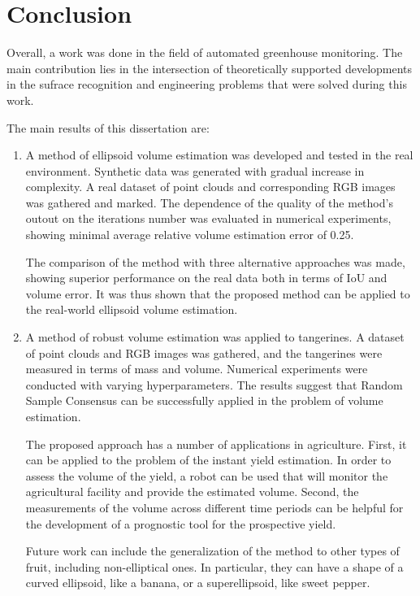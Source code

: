 \chapter{Conclusion}
\label{cap:conclusion}


Overall, a work was done in the field of automated greenhouse monitoring.
The main contribution lies in the intersection of theoretically supported developments in the sufrace recognition and engineering problems that were solved during this work.

The main results of this dissertation are:

\begin{enumerate}
\item A method of ellipsoid volume estimation was developed and tested in the real environment.
Synthetic data was generated with gradual increase in complexity.
A real dataset of point clouds and corresponding RGB images was gathered and marked.
The dependence of the quality of the method's outout on the iterations number was evaluated in numerical experiments, showing minimal average relative volume estimation error of 0.25.

The comparison of the method with three alternative approaches was made, showing superior performance on the real data both in terms of IoU and volume error.
It was thus shown that the proposed method can be applied to the real-world ellipsoid volume estimation.

\item A method of robust volume estimation was applied to tangerines.
A dataset of point clouds and RGB images was gathered, and the tangerines were measured in terms of mass and volume.
Numerical experiments were conducted with varying hyperparameters.
The results suggest that Random Sample Consensus can be successfully applied in the problem of volume estimation.

The proposed approach has a number of applications in agriculture.
First, it can be applied to the problem of the instant yield estimation.
In order to assess the volume of the yield, a robot can be used that will monitor the agricultural facility and provide the estimated volume.
Second, the measurements of the volume across different time periods can be helpful for the development of a prognostic tool for the prospective yield.

Future work can include the generalization of the method to other types of fruit, including non-elliptical ones.
In particular, they can have a shape of a curved ellipsoid, like a banana, or a superellipsoid, like sweet pepper.


\end{enumerate}

